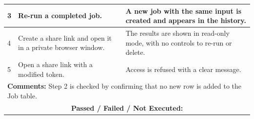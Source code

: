 \documentclass{FastFyp}
\begin{document}
{\begin{longtable}{|p{2.4cm}|p{4.6cm}|p{2.4cm}|p{3.8cm}|}
3 & Re-run a completed job. & \multicolumn{2}{p{6.64cm}|}{A new job with the same input is created and appears in the history.} \\ \hline
4 & Create a share link and open it in a private browser window. & \multicolumn{2}{p{6.64cm}|}{The results are shown in read-only mode, with no controls to re-run or delete.} \\ \hline
5 & Open a share link with a modified token. & \multicolumn{2}{p{6.64cm}|}{Access is refused with a clear message.} \\ \hline
\multicolumn{4}{|p{14.51cm}|}{\textbf{Comments:} Step 2 is checked by confirming that no new row is added to the Job table.} \\ \hline
\multicolumn{4}{|c|}{\textbf{Passed / Failed / Not Executed:}} \\ \hline
\end{longtable}
}
\end{document}
